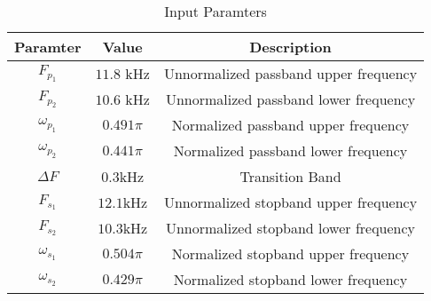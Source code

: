 \begin{table}[!h]
    \centering
    \begin{tabular}{|c|c|c|}
      \hline
      \textbf{Paramter}   & \textbf{Value} & \textbf{Description}\\
      \hline
       $F_{p_1}$  & $11.8$ kHz & Unnormalized passband upper frequency\\
       \hline
        $F_{p_2}$  & $10.6$ kHz & Unnormalized passband lower frequency\\
        \hline
        $\omega_{p_1}$ & $0.491\pi$ & Normalized passband upper frequency\\
        \hline
        $\omega_{p_2}$ & $0.441\pi$ & Normalized passband lower frequency\\
        \hline
        $\Delta F$ & $0.3$kHz & Transition Band\\
        \hline
        $F_{s_1}$ & $12.1$kHz & Unnormalized stopband upper frequency\\
        \hline
        $F_{s_2}$ & $10.3$kHz & Unnormalized stopband lower frequency\\
        \hline
        $\omega_{s_1}$ & $0.504\pi$ & Normalized stopband upper frequency\\
        \hline
        $\omega_{s_2}$ & $0.429\pi$ & Normalized stopband lower frequency\\
    \hline
    \end{tabular}
    \caption{Input Paramters}
    \label{tab:parameters}
\end{table}
